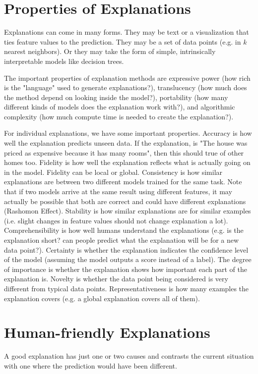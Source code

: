 \documentclass[a4paper]{article}
\begin{document}
\section{Properties of Explanations}
Explanations can come in many forms. They may be text or a visualization that
ties feature values to the prediction. They may be a set of data points (e.g.
in $k$ nearest neighbors). Or they may take the form of simple, intrinsically
interpretable models like decision trees.

The important properties of explanation methods are expressive power (how rich is
the "language" used to generate explanations?), translucency (how much does
the method depend on looking inside the model?), portability (how many different
kinds of models does the explanation work with?), and algorithmic complexity
(how much compute time is needed to create the explanation?).

For individual explanations, we have some important properties. Accuracy is
how well the explanation predicts unseen data. If the explanation, is "The house
was priced as expensive because it has many rooms", then this should true of
other homes too. Fidelity is how well the explanation reflects what is actually
going on in the model. Fidelity can be local or global. Consistency is how
similar explanations are between two different models trained for the same
task. Note that if two models arrive at the same result using different features,
it may actually be possible that both are correct and could have different
explanations (Rashomon Effect). Stability is how similar explanations are for
similar examples (i.e. slight changes in feature values should not change
explanation a lot). Comprehensibility is how well humans understand the
explanations (e.g. is the explanation short? can people predict what the
explanation will be for a new data point?). Certainty is whether the explanation
indicates the confidence level of the model (assuming the model outputs a score
instead of a label). The degree of importance is whether the explanation shows
how important each part of the explanation is. Novelty is whether the data point
being considered is very different from typical data points. Representativeness
is how many examples the explanation covers (e.g. a global explanation covers
all of them).

\section{Human-friendly Explanations}
A good explanation has just one or two causes and contrasts the current situation
with one where the prediction would have been different.
\end{document}
